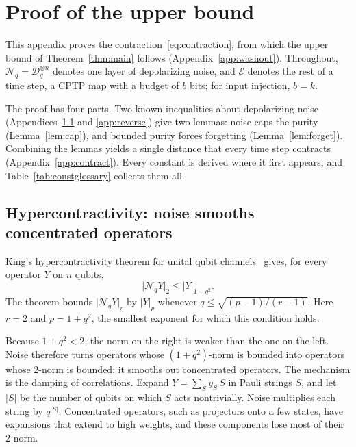 \documentclass[aps,pra,reprint,superscriptaddress,floatfix]{revtex4-2}
\theoremstyle{plain}
\newcommand{\nrm}[2]{\lvert #1\rvert_{#2}}
\newcommand{\cD}{\mathcal D}
\newcommand{\cE}{\mathcal E}
\newcommand{\Nq}{\mathcal N_q}
\begin{document}
\section{Proof of the upper bound}
\label{app:upper}

This appendix proves the contraction~\eqref{eq:contraction}, from which the upper bound of Theorem~\ref{thm:main} follows (Appendix~\ref{app:washout}). Throughout, $\Nq=\cD_q^{\otimes n}$ denotes one layer of depolarizing noise, and $\cE$ denotes the rest of a time step, a CPTP map with a budget of $b$ bits; for input injection, $b=k$.

The proof has four parts. Two known inequalities about depolarizing noise (Appendices~\ref{app:hyper} and \ref{app:reverse}) give two lemmas: noise caps the purity (Lemma~\ref{lem:cap}), and bounded purity forces forgetting (Lemma~\ref{lem:forget}). Combining the lemmas yields a single distance that every time step contracts (Appendix~\ref{app:contract}). Every constant is derived where it first appears, and Table~\ref{tab:constglossary} collects them all.

\subsection{Hypercontractivity: noise smooths concentrated operators}
\label{app:hyper}

King's hypercontractivity theorem for unital qubit channels~\cite[Corollary~2]{King2014} gives, for every operator $Y$ on $n$ qubits,
\begin{equation}
\nrm{\Nq Y}2\le\nrm Y{1+q^2}.
\label{eq:A-king}
\end{equation}
The theorem bounds $\nrm{\Nq Y}r$ by $\nrm Yp$ whenever $q\le\sqrt{(p-1)/(r-1)}$. Here $r=2$ and $p=1+q^2$, the smallest exponent for which this condition holds.

Because $1+q^2<2$, the norm on the right is weaker than the one on the left. Noise therefore turns operators whose $(1+q^2)$-norm is bounded into operators whose 2-norm is bounded: it smooths out concentrated operators. The mechanism is the damping of correlations. Expand $Y=\sum_Sy_S\,S$ in Pauli strings $S$, and let $|S|$ be the number of qubits on which $S$ acts nontrivially. Noise multiplies each string by $q^{|S|}$. Concentrated operators, such as projectors onto a few states, have expansions that extend to high weights, and these components lose most of their 2-norm.
\end{document}
